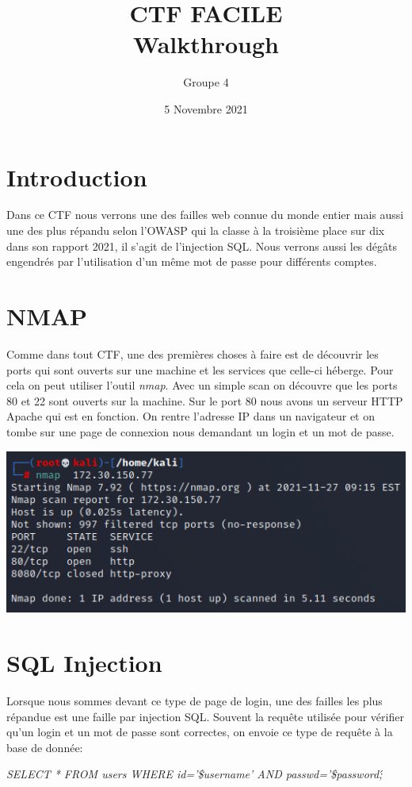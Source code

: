 \documentclass{article}
\title{\textbf{CTF FACILE}\\ \textbf{Walkthrough}}
\author{Groupe 4}
\date{5 Novembre 2021}
\begin{document}
\maketitle

\section*{Introduction}
Dans ce CTF nous verrons une des failles web connue du monde entier mais aussi une des plus répandu selon l'OWASP qui la classe à la troisième place sur dix dans son rapport 2021, il s'agit de l'injection SQL. Nous verrons aussi les dégâts engendrés par l'utilisation d'un même mot de passe pour différents comptes.
\section{NMAP}
Comme dans tout CTF, une des premières choses à faire est de découvrir les ports qui sont ouverts sur une machine et les services que celle-ci héberge. Pour cela on peut utiliser l'outil \textit{nmap}. Avec un simple scan on découvre que les ports 80 et 22 sont ouverts sur la machine. 
Sur le port 80 nous avons un serveur HTTP Apache qui est en fonction. On rentre l'adresse IP dans un navigateur et on tombe sur une page de connexion nous demandant un login et un mot de passe.\\

\centerline{\includegraphics[scale=0.40]{img/nmap.png}}
\section{SQL Injection}
Lorsque nous sommes devant ce type de page de login, une des failles les plus répandue est une faille par injection SQL. Souvent la requête utilisée pour vérifier qu'un login et un mot de passe sont correctes, on envoie ce type de requête à la base de donnée:\newline

\begin{center}
    \textit{SELECT * FROM users WHERE id='\$username' AND passwd='\$password\';}\newline
\end{center}
\end{document}
